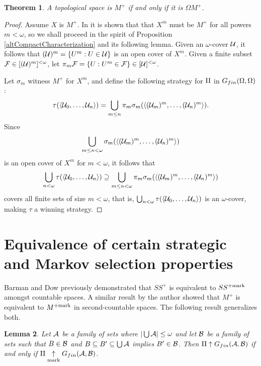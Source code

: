 \documentclass{amsart}
\theoremstyle{plain}
\newtheorem{theorem}{Theorem}
\newtheorem{lemma}[theorem]{Lemma}
\theoremstyle{definition}
\theoremstyle{remark}
\theoremstyle{plain}
\theoremstyle{definition}
\theoremstyle{remark}
\begin{document}
\begin{theorem}
  A topological space is \(M^+\) if and only if it is \(\Omega M^+\).
\end{theorem}

\begin{proof}
  Assume \(X\) is \(M^+\). In \cite[Proposition 5.1]{MR3383283} it is shown
  that that \(X^m\) must be \(M^+\) for all powers \(m<\omega\), so we shall
  proceed in the spirit of Proposition \ref{altCompactCharacterization}
  and its following lemma. Given an \(\omega\)-cover \(\mathcal{U}\),
  it follows that \((\mathcal{U})^m=\{U^m:U\in\mathcal{U}\}\) is an open cover of
  \(X^m\). Given a finite subset \(\mathcal{F}\in[(\mathcal{U})^m]^{<\omega}\),
  let \(\pi_m\mathcal{F}=\{U:U^m\in\mathcal{F}\}\in[\mathcal{U}]^{<\omega}\).

  Let \(\sigma_m\) witness \(M^+\) for \(X^m\), and define
  the following strategy for \(\mathrm{II}\) in \(G_{fin}(\Omega,\Omega)\):
  \[
    \tau(\langle\mathcal{U}_0,\dots,\mathcal{U}_n\rangle)
      =
    \bigcup_{m\leq n}
    \pi_m\sigma_m(\langle(\mathcal{U}_m)^m,\dots,(\mathcal{U}_n)^m\rangle)
  .\]
  Since
  \[
    \bigcup_{m\leq n<\omega}
    \sigma_m(\langle(\mathcal{U}_m)^m,\dots,(\mathcal{U}_n)^m\rangle)
  \]
  is an open cover of \(X^m\) for \(m<\omega\), it follows that
  \[
    \bigcup_{n<\omega}
    \tau(\langle\mathcal{U}_0,\dots,\mathcal{U}_n\rangle)
      \supseteq
    \bigcup_{m\leq n<\omega}
    \pi_m\sigma_m(\langle(\mathcal{U}_m)^m,\dots,(\mathcal{U}_n)^m\rangle)
  \]
  covers all finite sets of size \(m<\omega\), that is,
  \(
    \bigcup_{n<\omega}
    \tau(\langle\mathcal{U}_0,\dots,\mathcal{U}_n\rangle)
  \)
  is an \(\omega\)-cover, making \(\tau\) a winning strategy.
\end{proof}

\section{Equivalence of certain strategic and Markov selection properties}

Barman and Dow
previously demonstrated that \(SS^+\) is equivalent to
\(SS^{+\mathrm{mark}}\) amongst countable spaces.
A similar result by the author
showed that \(M^+\) is equivalent to \(M^{+\mathrm{mark}}\) in second-countable
spaces. The following result generalizes both.

\begin{lemma}\label{mainLemma}
  Let \(\mathcal{A}\) be a family of sets where
  \(|\bigcup\mathcal{A}|\leq\omega\)
  and let \(\mathcal{B}\) be a family of sets such that
  \(B\in\mathcal{B}\) and \(B\subseteq B'\subseteq\bigcup\mathcal{A}\)
  implies \(B'\in\mathcal{B}\). Then
  \(\mathrm{II}\uparrow G_{fin}(\mathcal{A},\mathcal{B})\) if and only if
  \(\mathrm{II}\underset{\text{mark}}{\uparrow}G_{fin}(\mathcal{A},\mathcal{B})\).
\end{lemma}
\end{document}
